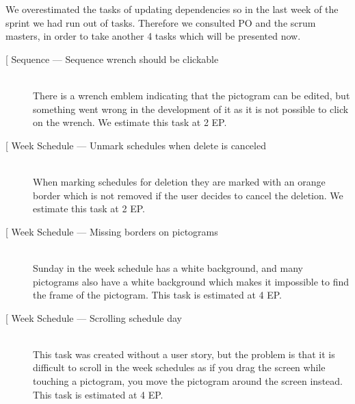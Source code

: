 We overestimated the tasks of updating dependencies so in the last week of the sprint we had run out of tasks.
Therefore we consulted PO and the scrum masters, in order to take another 4 tasks which will be presented now.

\begin{description}
    \item[{[}\phigh{]} Sequence --- Sequence wrench should be clickable] \hfill \\
        There is a wrench emblem indicating that the pictogram can be edited, but something went wrong in the development of it as it is not possible to click on the wrench.
        We estimate this task at 2 EP.
    \item[{[}\phigh{]} Week Schedule --- Unmark schedules when delete is canceled] \hfill \\
        When marking schedules for deletion they are marked with an orange border which is not removed if the user decides to cancel the deletion.
        We estimate this task at 2 EP.
    \item[{[}\phigh{]} Week Schedule --- Missing borders on pictograms] \hfill \\
        Sunday in the week schedule has a white background, and many pictograms also have a white background which makes it impossible to find the frame of the pictogram.
        This task is estimated at 4 EP.
    \item[{[}\phigh{]} Week Schedule --- Scrolling schedule day] \hfill\\
        This task was created without a user story, but the problem is that it is difficult to scroll in the week schedules as if you drag the screen while touching a pictogram, you move the pictogram around the screen instead.
        This task is estimated at 4 EP.
\end{description}
